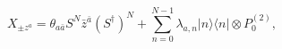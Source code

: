 \begin{equation}\label{eq:anx}
 X_{\pm z^a}=\theta_{a\bar{a}}S^N\bar{z}^{\bar{a}}(S^\dagger)^N+
 \sum_{n=0}^{N-1}\lambda_{a,n}|n\rangle\langle n|\otimes P_0^{(2)},
\end{equation}

